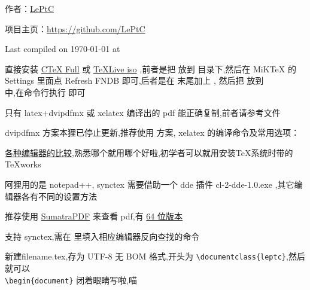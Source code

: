 \documentclass{leptc}
\begin{document}

作者：\href{mailto:alileptc@gmail.com}{LePtC}

项目主页：\url{https://github.com/LePtC }

Last compiled on {\yyyymmdddate\today} at \currenttime



 直接安装 \href{http://www.ctex.org/CTeXDownload }{CTeX Full} 或 \href{http://www.ctan.org/tex-archive/systems/texlive/Images/ }{TeXLive iso} ,前者是把  放到  目录下,然后在 MiKTeX 的 Settings 里面点 Refresh FNDB 即可,后者是在  末尾加上 , 然后把 放到 \\  中,在命令行执行  即可

只有 latex+dvipdfmx 或 xelatex 编译出的 pdf 能正确复制,前者请参考文件 

dvipdfmx 方案本狸已停止更新,推荐使用 \XeTeX 方案, xelatex 的编译命令及常用选项：



 \href{http://tex.stackexchange.com/questions/339/latex-editors-ides }{各种编辑器的比较},熟悉哪个就用哪个好啦,初学者可以就用安装\TeX 系统时带的 TeXworks 

阿狸用的是 notepad++, synctex 需要借助一个 dde 插件 cl-2-dde-1.0.exe ,其它编辑器各有不同的设置方法

 推荐使用 \href{http://blog.kowalczyk.info/software/sumatrapdf/download-free-pdf-viewer-cn.html }{SumatraPDF} 来查看 pdf,有 \href{http://xhmikosr.1f0.de/sumatrapdf/ }{64 位版本}

支持 synctex,需在  里填入相应编辑器反向查找的命令

新建filename.tex,存为 UTF-8 无 BOM 格式,开头为 \verb|\documentclass{leptc}|,然后就可以 \\ \verb|\begin{document}| 闭着眼睛写啦,喵 \tld

\end{document}
